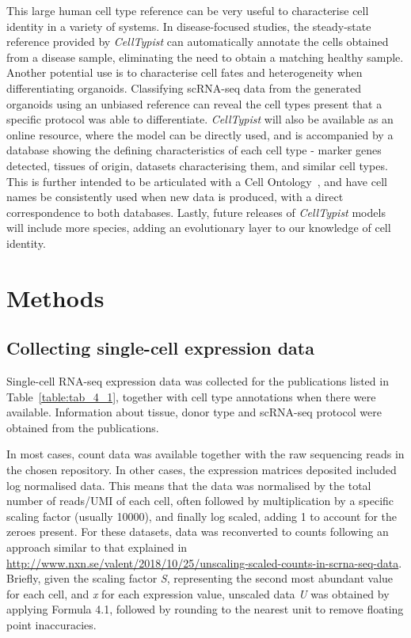 This large human cell type reference can be very useful to characterise cell identity in a variety of systems. In disease-focused studies, the steady-state reference provided by \textit{CellTypist} can automatically annotate the cells obtained from a disease sample, eliminating the need to obtain a matching healthy sample. Another potential use is to characterise cell fates and heterogeneity when differentiating organoids. Classifying scRNA-seq data from the generated organoids using an unbiased reference can reveal the cell types present that a specific protocol was able to differentiate. \textit{CellTypist} will also be available as an online resource, where the model can be directly used, and is accompanied by a database showing the defining characteristics of each cell type - marker genes detected, tissues of origin, datasets characterising them, and similar cell types. This is further intended to be articulated with a Cell Ontology~\citep{bard_ontology_2005}, and have cell names be consistently used when new data is produced, with a direct correspondence to both databases. Lastly, future releases of \textit{CellTypist} models will include more species, adding an evolutionary layer to our knowledge of cell identity.


\section{Methods}
\label{section4.4}
\subsection{Collecting single-cell expression data}
\label{section4.4_datacol}
Single-cell RNA-seq expression data was collected for the publications listed in Table~\ref{table:tab_4_1}, together with cell type annotations when there were available. Information about tissue, donor type and scRNA-seq protocol were obtained from the publications.

In most cases, count data was available together with the raw sequencing reads in the chosen repository. In other cases, the expression matrices deposited included log normalised data. This means that the data was normalised by the total number of reads/UMI of each cell, often followed by multiplication by a specific scaling factor (usually 10000), and finally log scaled, adding 1 to account for the zeroes present. For these datasets, data was reconverted to counts following an approach similar to that explained in \url{http://www.nxn.se/valent/2018/10/25/unscaling-scaled-counts-in-scrna-seq-data}. Briefly, given the scaling factor \textit{S}, representing the second most abundant value for each cell, and \textit{x} for each expression value, unscaled data \textit{U} was obtained by applying Formula 4.1, followed by rounding to the nearest unit to remove floating point inaccuracies.


